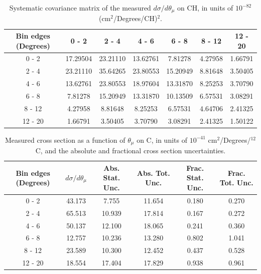 \documentclass[aps,prl,twocolumn,superscriptaddress,nofootinbib]{revtex4-1}
\begin{document}
\begin{table}[h!]
  \centering
  \caption{Systematic covariance matrix of the measured $d\sigma/d\theta_{\mu}$ on CH, in units of $10^{-82}$ (cm$^{2}$/Degrees/CH)$^{2}$.}
    \begin{tabular}{c||cccccc}
      Bin edges (Degrees) & 0 - 2 & 2 - 4 & 4 - 6 & 6 - 8 & 8 - 12 & 12 - 20 \\
\hline \hline
        0 - 2 & 17.29504 & 23.21110 & 13.62761 &  7.81278 &  4.27958 &  1.66791 \\
        2 - 4 & 23.21110 & 35.64265 & 23.80553 & 15.20949 &  8.81648 &  3.50405 \\
        4 - 6 & 13.62761 & 23.80553 & 18.97604 & 13.31870 &  8.25253 &  3.70790 \\
        6 - 8 &  7.81278 & 15.20949 & 13.31870 & 10.13509 &  6.57531 &  3.08291 \\
       8 - 12 &  4.27958 &  8.81648 &  8.25253 &  6.57531 &  4.64706 &  2.41325 \\
      12 - 20 &  1.66791 &  3.50405 &  3.70790 &  3.08291 &  2.41325 &  1.50122 \\
    \end{tabular}
  \label{tablecov:CH_Systematic_ThetaMu}
\end{table}

\begin{table}[h!]
  \centering
  \caption{Measured cross section as a function of $\theta_{\mu}$ on C, in units of
  $10^{-41}$ $\text{cm}^{2}$/Degrees/$^{12}$C, and the absolute and
  fractional cross section uncertainties.}
    \begin{tabular}{c||c||c|c||c|c}
      Bin edges (Degrees)  &  $d\sigma/d\theta_{\mu}$  &  Abs. Stat. Unc. & Abs. Tot. Unc.  &  Frac. Stat. Unc.  &  Frac. Tot. Unc. \\
      \hline\hline
        0 - 2 & 43.173 & 7.755 & 11.654 & 0.180 & 0.270 \\
        2 - 4 & 65.513 & 10.939 & 17.814 & 0.167 & 0.272 \\
        4 - 6 & 50.137 & 12.100 & 18.065 & 0.241 & 0.360 \\
        6 - 8 & 12.757 & 10.236 & 13.280 & 0.802 & 1.041 \\
       8 - 12 & 23.589 & 10.300 & 12.452 & 0.437 & 0.528 \\
      12 - 20 & 18.554 & 17.404 & 17.829 & 0.938 & 0.961 \\
    \end{tabular}
  \label{table:ThetaMuXSec_C}
\end{table}
\end{document}
